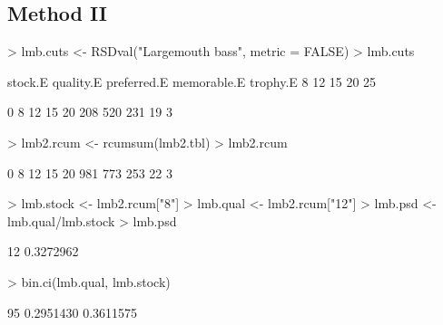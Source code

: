 \documentclass[a4paper]{article}
\begin{document}
\subsection{Method II}
\begin{Schunk}
\begin{Sinput}
> lmb.cuts <- RSDval("Largemouth bass", metric = FALSE)
> lmb.cuts
\end{Sinput}
\begin{Soutput}
    stock.E   quality.E preferred.E memorable.E    trophy.E
          8          12          15          20          25
\end{Soutput}
\begin{Soutput}
  0   8  12  15  20
208 520 231  19   3
\end{Soutput}
\begin{Sinput}
> lmb2.rcum <- rcumsum(lmb2.tbl)
> lmb2.rcum
\end{Sinput}
\begin{Soutput}
  0   8  12  15  20
981 773 253  22   3
\end{Soutput}
\begin{Sinput}
> lmb.stock <- lmb2.rcum["8"]
> lmb.qual <- lmb2.rcum["12"]
> lmb.psd <- lmb.qual/lmb.stock
> lmb.psd
\end{Sinput}
\begin{Soutput}
       12
0.3272962
\end{Soutput}
\begin{Sinput}
> bin.ci(lmb.qual, lmb.stock)
\end{Sinput}
\begin{Soutput}
  95% LCI   95% UCI
0.2951430 0.3611575
\end{Soutput}
\end{Schunk}
\end{document}
